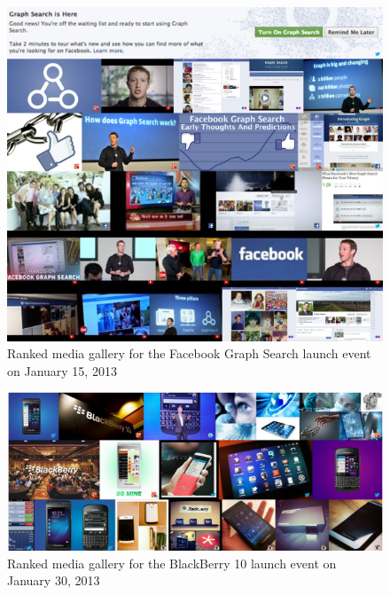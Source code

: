\begin{figure}[!ht]
  \centering
  \includegraphics[width=0.75\linewidth]{facebook.png}
  \caption[Ranked media gallery for the Facebook Graph Search launch event]
  {Ranked media gallery for the Facebook Graph Search launch event
  on January 15, 2013}
  \label{fig:facebookgraphsearch}
\end{figure}

\begin{figure}[!ht]
  \centering
  \includegraphics[width=0.75\linewidth]{blackberry.png}
  \caption[Ranked media gallery for the BlackBerry 10 launch event]
  {Ranked media gallery for the BlackBerry 10 launch event on January 30, 2013}
  \label{fig:blackberry}
\end{figure}

